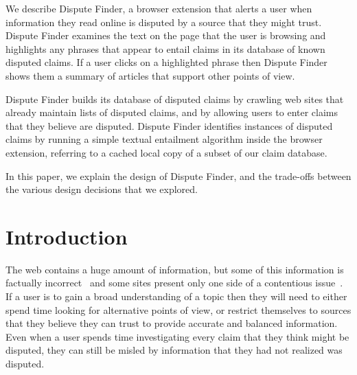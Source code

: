 \documentclass{www2010-submission}
\newcommand{\todo}[1]{}
\begin{document}
\abstract

We describe Dispute Finder, a browser extension that alerts a user when information they read online is disputed by a source that they might trust. Dispute Finder examines the text on the page that the user is browsing and highlights any phrases that appear to entail claims in its database of known disputed claims. If a user clicks on a highlighted phrase then Dispute Finder shows them a summary of articles that support other points of view.

Dispute Finder builds its database of disputed claims by crawling web sites that already maintain lists of disputed claims, and by allowing users to enter claims that they believe are disputed. Dispute Finder identifies instances of disputed claims by running a simple textual entailment algorithm inside the browser extension, referring to a cached local copy of a subset of our claim database.

In this paper, we explain the design of Dispute Finder, and the trade-offs between the various design decisions that we explored. 






\section{Introduction}

\todo{update screenshots}
\todo{should this be spun as about news, or information in general}
\todo{need to talk more about what we know about people}
 

The web contains a huge amount of information, but some of this information is factually incorrect~\cite{Neumann2003,Resnik1998,Zhou2004} and some sites present only one side of a contentious issue~\cite{Herman2002}. If a user is to gain a broad understanding of a topic then they will need to either spend time looking for alternative points of view, or restrict themselves to sources that they believe they can trust to provide accurate and balanced information. Even when a user spends time investigating every claim that they think might be disputed, they can still be misled by information that they had not realized was disputed.
\end{document}
